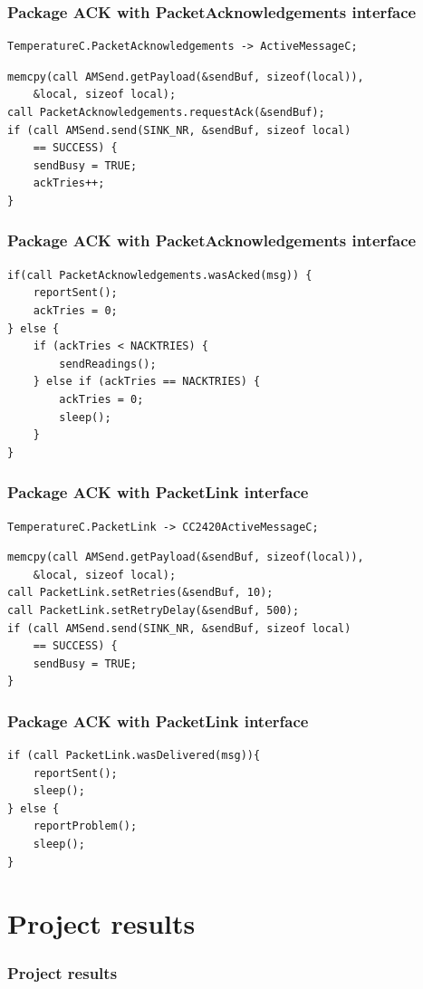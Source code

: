 \documentclass{beamer}
\begin{document}
\begin{frame}[fragile]
\frametitle{Package ACK with PacketAcknowledgements interface}
\begin{lstlisting}[caption={TemperatureAppC.nc}]
 TemperatureC.PacketAcknowledgements -> ActiveMessageC;
\end{lstlisting}


\begin{lstlisting}[caption={TemperatureC.nc $\rightarrow$ sendReadings()}]
memcpy(call AMSend.getPayload(&sendBuf, sizeof(local)),
    &local, sizeof local);
call PacketAcknowledgements.requestAck(&sendBuf);
if (call AMSend.send(SINK_NR, &sendBuf, sizeof local)
    == SUCCESS) {
    sendBusy = TRUE;
    ackTries++;
}
\end{lstlisting}

\end{frame}

\begin{frame}[fragile]
\frametitle{Package ACK with PacketAcknowledgements interface}

\begin{lstlisting}[caption={TemperatureC.nc $\rightarrow$ AMSend.sendDone()}]
if(call PacketAcknowledgements.wasAcked(msg)) {
    reportSent();
    ackTries = 0;
} else {
    if (ackTries < NACKTRIES) {
        sendReadings();
    } else if (ackTries == NACKTRIES) {
        ackTries = 0;
        sleep();
    }
}
\end{lstlisting}

\end{frame}

\begin{frame}[fragile]
\frametitle{Package ACK with PacketLink interface}
\begin{lstlisting}[caption={TemperatureAppC.nc}]
TemperatureC.PacketLink -> CC2420ActiveMessageC;
\end{lstlisting}

\begin{lstlisting}[caption={TemperatureC.nc $\rightarrow$ sendReadings()}]
memcpy(call AMSend.getPayload(&sendBuf, sizeof(local)),
    &local, sizeof local);
call PacketLink.setRetries(&sendBuf, 10);
call PacketLink.setRetryDelay(&sendBuf, 500);
if (call AMSend.send(SINK_NR, &sendBuf, sizeof local)
    == SUCCESS) {
    sendBusy = TRUE;
}
\end{lstlisting}

\end{frame}

\begin{frame}[fragile]
\frametitle{Package ACK with PacketLink interface}

\begin{lstlisting}[caption={TemperatureC.nc $\rightarrow$ AMSend.sendDone()}]
if (call PacketLink.wasDelivered(msg)){
    reportSent();
    sleep();
} else {
    reportProblem();
    sleep();
}
\end{lstlisting}

\end{frame}


\section{Project results}

\begin{frame}
\frametitle{Project results}
 
\end{frame}
\end{document}
